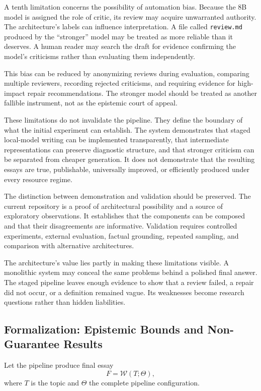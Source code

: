 \documentclass[11pt]{article}
\begin{document}
A tenth limitation concerns the possibility of automation bias. Because the 8B model is assigned the role of critic, its review may acquire unwarranted authority. The architecture's labels can influence interpretation. A file called \texttt{review.md} produced by the ``stronger'' model may be treated as more reliable than it deserves. A human reader may search the draft for evidence confirming the model's criticisms rather than evaluating them independently.

This bias can be reduced by anonymizing reviews during evaluation, comparing multiple reviewers, recording rejected criticisms, and requiring evidence for high-impact repair recommendations. The stronger model should be treated as another fallible instrument, not as the epistemic court of appeal.

These limitations do not invalidate the pipeline. They define the boundary of what the initial experiment can establish. The system demonstrates that staged local-model writing can be implemented transparently, that intermediate representations can preserve diagnostic structure, and that stronger criticism can be separated from cheaper generation. It does not demonstrate that the resulting essays are true, publishable, universally improved, or efficiently produced under every resource regime.

The distinction between demonstration and validation should be preserved. The current repository is a proof of architectural possibility and a source of exploratory observations. It establishes that the components can be composed and that their disagreements are informative. Validation requires controlled experiments, external evaluation, factual grounding, repeated sampling, and comparison with alternative architectures.

The architecture's value lies partly in making these limitations visible. A monolithic system may conceal the same problems behind a polished final answer. The staged pipeline leaves enough evidence to show that a review failed, a repair did not occur, or a definition remained vague. Its weaknesses become research questions rather than hidden liabilities.

\subsection{Formalization: Epistemic Bounds and Non-Guarantee Results}

Let the pipeline produce final essay
\[
    F
    =
    \mathcal{W}(T;\Theta),
\]
where \(T\) is the topic and \(\Theta\) the complete pipeline configuration.
\end{document}
